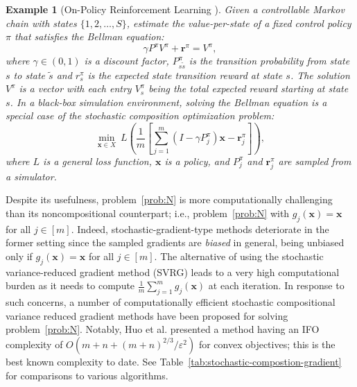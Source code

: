 \documentclass[11pt]{article}
\newtheorem{example}{Example}[section]
\newcommand{\sr}{\mathbf r}
\newcommand{\x}{\mathbf x}
\newcommand{\etal}{{et al. }}
\begin{document}
\begin{example}[On-Policy Reinforcement Learning \cite{Sutton-1998-Reinforcement, Puterman-2014-Markov}]\label{Example:RL}
Given a controllable Markov chain with states $\{1,2,\ldots,S\}$, estimate the value-per-state of a fixed control policy $\pi$ that satisfies the Bellman equation:
\begin{equation*}
\gamma P^\pi V^\pi + \sr^\pi = V^\pi,
\end{equation*}
where $\gamma\in\left(0,1\right)$ is a discount factor, $P_{s\tilde{s}}^{\pi}$ is the transition probability from state $s$ to state $\tilde{s}$ and $r_s^\pi$ is the expected state transition reward at state $s$. The solution $V^\pi$ is a vector with each entry $V_s^\pi$ being the total expected reward starting at state $s$. In a black-box simulation environment, solving the Bellman equation is a special case of the stochastic composition optimization problem:
\begin{equation*}
\min_{\x\in X} \ L\left( \frac{1}{m}\left[\sum_{j=1}^m \left(I-\gamma P_j^\pi\right) \x - \sr_j^\pi\right]\right),
\end{equation*}
where $L$ is a general loss function, $\x$ is a policy, and $P_j^\pi$ and $\sr_j^\pi$ are sampled from a simulator.  
\end{example}
Despite its usefulness, problem~\eqref{prob:N} is more computationally challenging than its noncompositional counterpart; i.e., problem~\eqref{prob:N} with $g_j(\x)=\x$ for all $j\in[m]$. Indeed, stochastic-gradient-type methods deteriorate in the former setting since the sampled gradients are \textit{biased} in general, being unbiased only if $g_j(\x)=\x$ for all $j\in[m]$. The alternative of using the stochastic variance-reduced gradient method (SVRG) \cite{Johnson-2013-Accelerating} leads to a very high computational burden as it needs to compute $\frac{1}{m}\sum_{j=1}^m g_j(\x)$ at each iteration.
In response to such concerns, a number of computationally efficient stochastic compositional variance reduced gradient methods have been proposed for solving problem~\eqref{prob:N}. Notably, Huo \etal\cite{Huo-2017-Accelerated} presented a method having an IFO complexity of $O\left(m+n+(m+n)^{2/3}/\varepsilon^2\right)$ for convex objectives; this is the best known complexity to date. See Table~\ref{tab:stochastic-compostion-gradient} for comparisons to various algorithms. 
\end{document}
